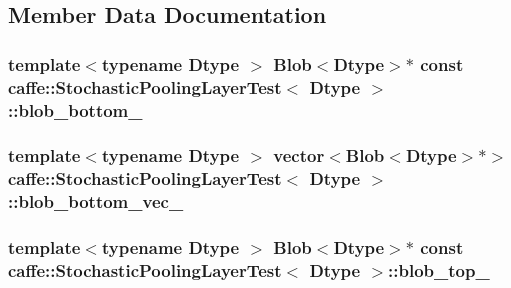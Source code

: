 \subsection{Member Data Documentation}
\hypertarget{classcaffe_1_1_stochastic_pooling_layer_test_acfdbcddde109307b6d1c14d4a4a79d99}{
\subsubsection[{blob\+\_\+bottom\+\_\+}]{\setlength{\rightskip}{0pt plus 5cm}template$<$typename Dtype $>$ {\bf Blob}$<$Dtype$>$$\ast$ const {\bf caffe\+::\+Stochastic\+Pooling\+Layer\+Test}$<$ Dtype $>$\+::blob\+\_\+bottom\+\_\+\hspace{0.3cm}{\ttfamily [protected]}}}\label{classcaffe_1_1_stochastic_pooling_layer_test_acfdbcddde109307b6d1c14d4a4a79d99}
\hypertarget{classcaffe_1_1_stochastic_pooling_layer_test_a681e00e65c631e315bb9476125814191}{
\subsubsection[{blob\+\_\+bottom\+\_\+vec\+\_\+}]{\setlength{\rightskip}{0pt plus 5cm}template$<$typename Dtype $>$ vector$<${\bf Blob}$<$Dtype$>$$\ast$$>$ {\bf caffe\+::\+Stochastic\+Pooling\+Layer\+Test}$<$ Dtype $>$\+::blob\+\_\+bottom\+\_\+vec\+\_\+\hspace{0.3cm}{\ttfamily [protected]}}}\label{classcaffe_1_1_stochastic_pooling_layer_test_a681e00e65c631e315bb9476125814191}
\hypertarget{classcaffe_1_1_stochastic_pooling_layer_test_a6a1aef2e44eab8ca1d39d46513d2997b}{
\subsubsection[{blob\+\_\+top\+\_\+}]{\setlength{\rightskip}{0pt plus 5cm}template$<$typename Dtype $>$ {\bf Blob}$<$Dtype$>$$\ast$ const {\bf caffe\+::\+Stochastic\+Pooling\+Layer\+Test}$<$ Dtype $>$\+::blob\+\_\+top\+\_\+\hspace{0.3cm}{\ttfamily [protected]}}}\label{classcaffe_1_1_stochastic_pooling_layer_test_a6a1aef2e44eab8ca1d39d46513d2997b}
